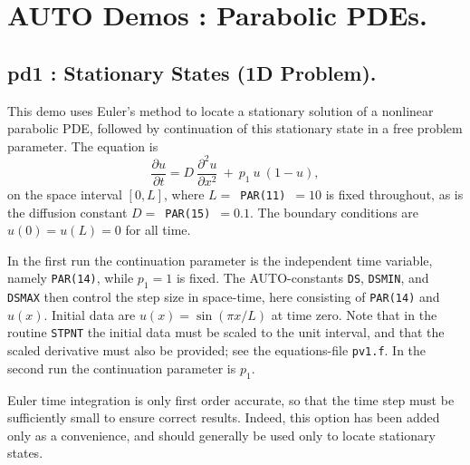 \documentclass[12pt]{report}
\begin{document}
\chapter{ {\cal AUTO} Demos : Parabolic PDEs.} \label{ch:Demos_PDE}

\newpage
\section{ pd1 : Stationary States (1D Problem).} \label{sec:Demos_pd1}
This demo uses Euler's method to locate a stationary solution of
a nonlinear parabolic PDE, followed by continuation of this stationary
state in a free problem parameter. The equation is
 $$ \frac{\partial u }{ \partial t} 
  = D~\frac{\partial^2 u }{ \partial x^2} ~+~  p_1~ u ~( 1-u) , $$
on the space interval $[0,L]$, where $L=$~{\tt PAR(11)}~$=10$ is fixed throughout,
as is the diffusion constant $D=$~{\tt PAR(15)}~$=0.1$.
The boundary conditions are $u(0) = u(L) = 0$ for all time.

In the first run the continuation parameter is the independent time variable,
namely {\tt PAR(14)}, while $p_1=1$ is fixed.
The {\cal AUTO}-constants {\tt DS}, {\tt DSMIN}, and {\tt DSMAX} then control the step size
in space-time, here consisting of {\tt PAR(14)} and  $u(x)$.
Initial data are $u(x)=\sin(\pi x/L)$ at time zero.
Note that in the routine {\tt STPNT} the initial data must be scaled to 
the unit interval, and that the scaled derivative must also be provided; 
see the equations-file {\tt pv1.f}.
In the second run the continuation parameter is $p_1$.

Euler time integration is only first order accurate, so that
the time step must be sufficiently small to ensure correct results.
Indeed, this option has been added only as a convenience, and should 
generally be used only to locate stationary states.
\end{document}
